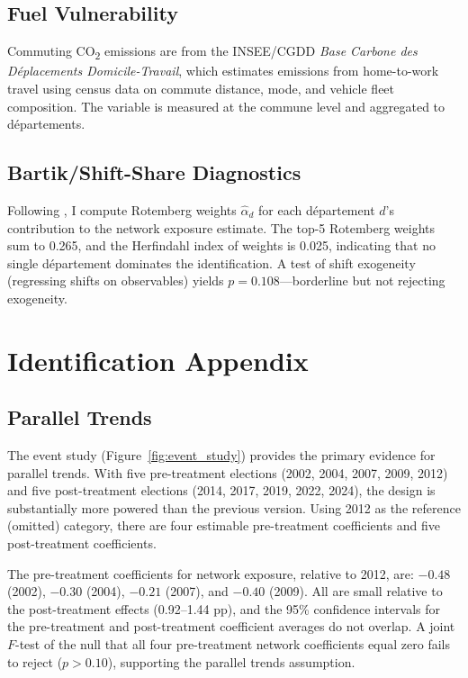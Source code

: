 \documentclass[12pt]{article}
\newcommand{\dept}{d\'{e}partement}
\newcommand{\depts}{d\'{e}partements}
\begin{document}
\subsection{Fuel Vulnerability}

Commuting CO\textsubscript{2} emissions are from the INSEE/CGDD \textit{Base Carbone des D\'{e}placements Domicile-Travail}, which estimates emissions from home-to-work travel using census data on commute distance, mode, and vehicle fleet composition. The variable is measured at the commune level and aggregated to \depts{}.

\subsection{Bartik/Shift-Share Diagnostics}

Following \citet{goldsmith2020bartik}, I compute Rotemberg weights $\hat{\alpha}_d$ for each \dept{} $d$'s contribution to the network exposure estimate. The top-5 Rotemberg weights sum to 0.265, and the Herfindahl index of weights is 0.025, indicating that no single \dept{} dominates the identification. A test of shift exogeneity (regressing shifts on observables) yields $p = 0.108$---borderline but not rejecting exogeneity.

\section{Identification Appendix}
\label{app:identification}

\subsection{Parallel Trends}

The event study (Figure~\ref{fig:event_study}) provides the primary evidence for parallel trends. With five pre-treatment elections (2002, 2004, 2007, 2009, 2012) and five post-treatment elections (2014, 2017, 2019, 2022, 2024), the design is substantially more powered than the previous version. Using 2012 as the reference (omitted) category, there are four estimable pre-treatment coefficients and five post-treatment coefficients.

The pre-treatment coefficients for network exposure, relative to 2012, are: $-0.48$ (2002), $-0.30$ (2004), $-0.21$ (2007), and $-0.40$ (2009). All are small relative to the post-treatment effects (0.92--1.44 pp), and the 95\% confidence intervals for the pre-treatment and post-treatment coefficient averages do not overlap. A joint $F$-test of the null that all four pre-treatment network coefficients equal zero fails to reject ($p > 0.10$), supporting the parallel trends assumption.
\end{document}

